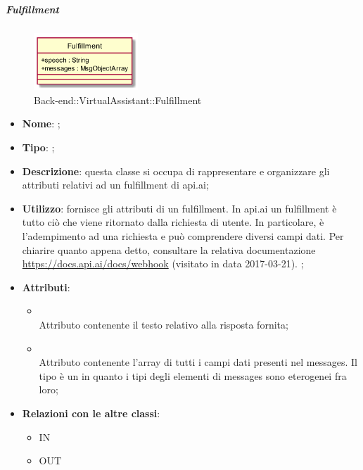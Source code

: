 \hypertarget{Fulfillment_label}{\subparagraph{Fulfillment}}
\begin{figure}[h]
	\centering
	\includegraphics[width=0.35\textwidth,height=\textheight,keepaspectratio]{images/ClassFulfillment.png}
	\caption{Back-end::VirtualAssistant::Fulfillment}
\end{figure}
\begin{itemize}
	\item \textbf{Nome}: ;
	\item \textbf{Tipo}: ;
	\item \textbf{Descrizione}: questa classe si occupa di rappresentare e organizzare gli attributi relativi ad un fulfillment di api.ai;
	\item \textbf{Utilizzo}: fornisce gli attributi di un fulfillment.
In api.ai un fulfillment è tutto ciò che viene ritornato dalla richiesta di utente. In particolare, è l'adempimento ad una richiesta e può comprendere diversi campi dati.
Per chiarire quanto appena detto, consultare la relativa documentazione \url{https://docs.api.ai/docs/webhook}  (visitato in data 2017-03-21).
;
	\item \textbf{Attributi}:
	\begin{itemize}
		\item[]  \\
		Attributo contenente il testo relativo alla risposta fornita;
		\item[]  \\
		Attributo contenente l'array di tutti i campi dati presenti nel messages.
Il tipo è un  in quanto i tipi degli elementi di messages sono eterogenei fra loro;
	\end{itemize}
	\item \textbf{Relazioni con le altre classi}:
	\begin{itemize}
		\item IN \hyperlink{ProcessingResult_label}{}
		\item OUT \hyperlink{MsgObject_label}{}
	\end{itemize}
\end{itemize}
\FloatBarrier

